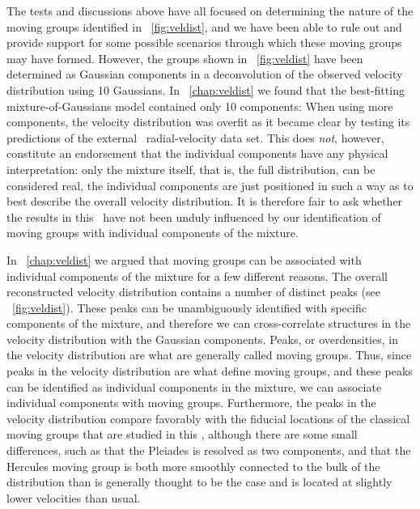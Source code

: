 The tests and discussions above have all focused on determining the
nature of the moving groups identified in
\figurename~\ref{fig:veldist}, and we have been able to rule out and
provide support for some possible scenarios through which these moving
groups may have formed. However, the groups shown in
\figurename~\ref{fig:veldist} have been determined as Gaussian
components in a deconvolution of the observed velocity distribution
using 10 Gaussians. In \chaptername~\ref{chap:veldist} we found that
the best-fitting mixture-of-Gaussians model contained only 10
components: When using more components, the velocity distribution was
overfit as it became clear by testing its predictions of the
external \gcsabb\ radial-velocity data set. This does \emph{not},
however, constitute an endorsement that the individual components have
any physical interpretation: only the mixture itself, that is, the
full distribution, can be considered real, the individual components
are just positioned in such a way as to best describe the overall
velocity distribution. It is therefore fair to ask whether the results
in this \chaptername\ have not been unduly influenced by our
identification of moving groups with individual components of the
mixture.

In \chaptername~\ref{chap:veldist} we argued that moving groups can be
associated with individual components of the mixture for a few
different reasons. The overall reconstructed velocity distribution
contains a number of distinct peaks
(see \figurename~\ref{fig:veldist}). These peaks can be unambiguously
identified with specific components of the mixture, and therefore we
can cross-correlate structures in the velocity distribution with the
Gaussian components. Peaks, or overdensities, in the velocity
distribution are what are generally called moving groups. Thus, since
peaks in the velocity distribution are what define moving groups, and
these peaks can be identified as individual components in the mixture,
we can associate individual components with moving
groups. Furthermore, the peaks in the velocity distribution compare
favorably with the fiducial locations of the classical moving groups
that are studied in this \chaptername, although there are some small
differences, such as that the Pleiades is resolved as two components,
and that the Hercules moving group is both more smoothly connected to
the bulk of the distribution than is generally thought to be the case
and is located at slightly lower velocities than usual.

